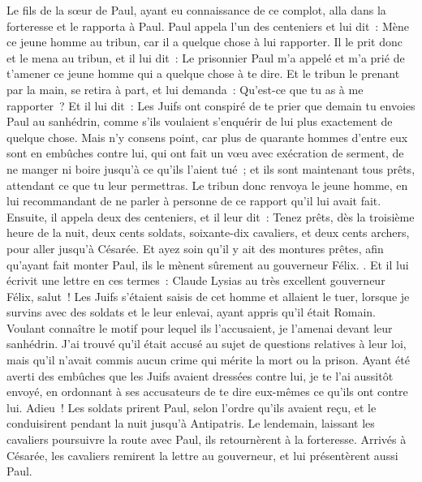 \begin{multicols}{2}
Le fils de la sœur de Paul, ayant eu connaissance de ce complot, alla dans la forteresse et le rapporta à Paul.
Paul appela l'un des centeniers et lui dit~: Mène ce jeune homme au tribun, car il a quelque chose à lui rapporter.
Il le prit donc et le mena au tribun, et il lui dit~: Le prisonnier Paul m'a appelé et m'a prié de t'amener ce jeune homme qui a quelque chose à te dire.
Et le tribun le prenant par la main, se retira à part, et lui demanda~: Qu'est-ce que tu as à me rapporter~?
Et il lui dit~: Les Juifs ont conspiré de te prier que demain tu envoies Paul au sanhédrin, comme s'ils voulaient s'enquérir de lui plus exactement de quelque chose.
Mais n'y consens point, car plus de quarante hommes d'entre eux sont en embûches contre lui, qui ont fait un vœu avec exécration de serment, de ne manger ni boire jusqu'à ce qu'ils l'aient tué~; et ils sont maintenant tous prêts, attendant ce que tu leur permettras.
Le tribun donc renvoya le jeune homme, en lui recommandant de ne parler à personne de ce rapport qu'il lui avait fait.
Ensuite, il appela deux des centeniers, et il leur dit~: Tenez prêts, dès la troisième heure de la nuit, deux cents soldats, soixante-dix cavaliers, et deux cents archers, pour aller jusqu'à Césarée.
Et ayez soin qu'il y ait des montures prêtes, afin qu'ayant fait monter Paul, ils le mènent sûrement au gouverneur Félix. .
Et il lui écrivit une lettre en ces termes~:
Claude Lysias au très excellent gouverneur Félix, salut~!
Les Juifs s'étaient saisis de cet homme et allaient le tuer, lorsque je survins avec des soldats et le leur enlevai, ayant appris qu'il était Romain.
Voulant connaître le motif pour lequel ils l'accusaient, je l'amenai devant leur sanhédrin.
J'ai trouvé qu'il était accusé au sujet de questions relatives à leur loi, mais qu'il n'avait commis aucun crime qui mérite la mort ou la prison.
Ayant été averti des embûches que les Juifs avaient dressées contre lui, je te l'ai aussitôt envoyé, en ordonnant à ses accusateurs de te dire eux-mêmes ce qu'ils ont contre lui. Adieu~!
Les soldats prirent Paul, selon l'ordre qu'ils avaient reçu, et le conduisirent pendant la nuit jusqu'à Antipatris.
Le lendemain, laissant les cavaliers poursuivre la route avec Paul, ils retournèrent à la forteresse.
Arrivés à Césarée, les cavaliers remirent la lettre au gouverneur, et lui présentèrent aussi Paul.

\end{multicols}
